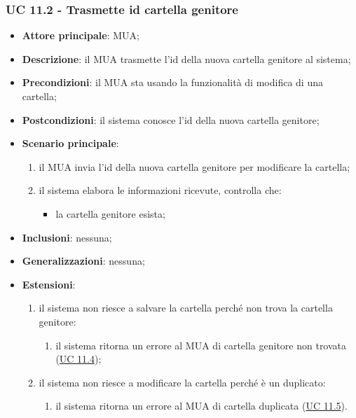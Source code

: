 \subsubsection{UC 11.2 - Trasmette id cartella genitore} \label{sec:UC11.2}
\begin{itemize}
    \item \textbf{Attore principale}: MUA;
    \item \textbf{Descrizione}: il MUA trasmette l'id della nuova cartella genitore al sistema;
    \item \textbf{Precondizioni}: il MUA sta usando la funzionalità di modifica di una cartella;
    \item \textbf{Postcondizioni}: il sistema conosce l'id della nuova cartella genitore;
    \item \textbf{Scenario principale}:
        \begin{enumerate}
            \item il MUA invia l'id della nuova cartella genitore per modificare la cartella;
            \item il sistema elabora le informazioni ricevute, controlla che:
            \begin{itemize}
                \item la cartella genitore esista;
            \end{itemize}
        \end{enumerate}
    \item \textbf{Inclusioni}: nessuna;
    \item \textbf{Generalizzazioni}: nessuna;
    \item \textbf{Estensioni}:
        \begin{enumerate}[label=\alph*.]
            \item il sistema non riesce a salvare la cartella perché non trova la cartella genitore:
            \begin{enumerate}[label=\arabic*.]
                \item il sistema ritorna un errore al MUA di cartella genitore non trovata (\hyperref[sec:UC11.4]{UC 11.4});
            \end{enumerate}
            \item il sistema non riesce a modificare la cartella perché è un duplicato:
            \begin{enumerate}[label=\arabic*.]
                \item il sistema ritorna un errore al MUA di cartella duplicata (\hyperref[sec:UC11.5]{UC 11.5}).
            \end{enumerate}
        \end{enumerate}
\end{itemize}



